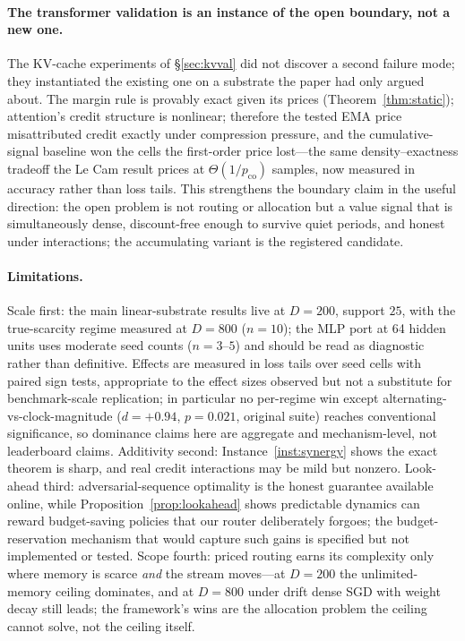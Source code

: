 \documentclass[10pt,twocolumn]{article}
\theoremstyle{definition}
\begin{document}
\paragraph{The transformer validation is an instance of the open boundary, not a new one.}
The {KV}-cache experiments of \S\ref{sec:kvval} did not discover a second failure mode; they instantiated
the existing one on a substrate the paper had only argued about. The margin rule is provably exact given
its prices (Theorem~\ref{thm:static}); attention's credit structure is nonlinear; therefore the tested
{EMA} price misattributed credit exactly under compression pressure, and the cumulative-signal baseline
won the cells the first-order price lost---the same density--exactness tradeoff the Le Cam result prices
at $\Theta(1/p_{\mathrm{co}})$ samples, now measured in accuracy rather than loss tails. This strengthens
the boundary claim in the useful direction: the open problem is not routing or allocation but a value
signal that is simultaneously dense, discount-free enough to survive quiet periods, and honest under
interactions; the accumulating variant is the registered candidate.

\paragraph{Limitations.}
Scale first: the main linear-substrate results live at $D{=}200$, support $25$, with the true-scarcity
regime measured at $D{=}800$ ($n{=}10$); the {MLP} port at 64 hidden units uses moderate seed counts
($n{=}3$--$5$) and should be read as diagnostic rather than definitive. Effects are measured in loss tails
over seed cells with paired sign tests, appropriate to the effect
sizes observed but not a substitute for benchmark-scale replication; in particular no per-regime win except
alternating-vs-clock-magnitude ($d{=}+0.94$, $p=0.021$, original suite) reaches conventional significance,
so dominance claims here are aggregate and mechanism-level, not leaderboard claims. Additivity second:
Instance~\ref{inst:synergy} shows the exact theorem is sharp, and real credit interactions may be mild but
nonzero. Look-ahead third: adversarial-sequence optimality is the honest guarantee available online, while
Proposition~\ref{prop:lookahead} shows predictable dynamics can reward budget-saving policies that our router
deliberately forgoes; the budget-reservation mechanism that would capture such gains is specified but not
implemented or tested. Scope fourth: priced routing earns its complexity only where memory is scarce
\emph{and} the stream moves---at $D{=}200$ the unlimited-memory ceiling dominates, and at $D{=}800$ under
drift dense SGD with weight decay still leads; the framework's wins are the allocation problem the ceiling
cannot solve, not the ceiling itself.
\end{document}
